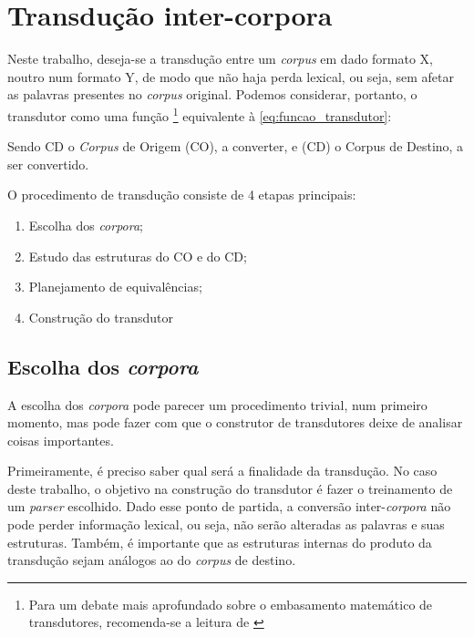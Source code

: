 \section{Transdução inter-corpora}
\label{sec:treino_metodologia}

Neste trabalho, deseja-se a transdução entre um \textit{corpus} em dado formato X, noutro num formato Y, de modo que não haja perda lexical, ou seja, sem afetar as palavras presentes no \textit{corpus} original. Podemos considerar, portanto, o transdutor como uma função
\footnote{Para um debate mais aprofundado sobre o embasamento matemático de transdutores, recomenda-se a leitura de \cite{weightedTransducersMohri}}
equivalente à \ref{eq:funcao_transdutor}:
\begin{center}
    
\end{center}

Sendo CD o \textit{Corpus} de Origem (CO), a converter, e (CD) o Corpus de Destino, a ser convertido.

O procedimento de transdução consiste de 4 etapas principais: 
\begin{enumerate}
    \item Escolha dos \textit{corpora}; 
    \item Estudo das estruturas do CO e do CD;
    \item Planejamento de equivalências;
    \item Construção do transdutor
\end{enumerate}

\begin{center}
    
\end{center}

\subsection{Escolha dos \textit{corpora}}
\label{subsec:escolha_corpora}

A escolha dos \textit{corpora} pode parecer um procedimento trivial, num primeiro momento, mas pode fazer com que o construtor de transdutores deixe de analisar coisas importantes. 

Primeiramente, é preciso saber qual será a finalidade da transdução. No caso deste trabalho, o objetivo na construção do transdutor é fazer o treinamento de um \textit{parser} escolhido. Dado esse ponto de partida, a conversão inter-\textit{corpora} não pode perder informação lexical, ou seja, não serão alteradas as palavras e suas estruturas. Também, é importante que as estruturas internas do produto da transdução sejam análogos ao do \textit{corpus} de destino.

